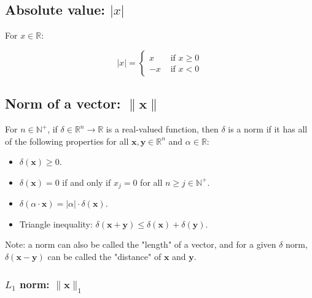 \documentclass[titlepage]{article}
\begin{document}
      \subsection{Absolute value: $|x|$}

        For $x \in \mathbb{R}$:

        \begin{equation*}
          | x | = \begin{cases}
              x & \text{ if } x \geq 0 \\
              -x & \text{ if } x < 0
          \end{cases}
        \end{equation*}

      \subsection{Norm of a vector: $\| \mathbf{x} \|$}

        For $n \in \mathbb{N}^+$, if
        $\delta \in \mathbb{R}^n \rightarrow \mathbb{R}$ is a
        real-valued function, then $\delta$ is a norm if it has all of the
        following properties for all $\mathbf{x}, \mathbf{y} \in \mathbb{R}^n$
        and $\alpha \in \mathbb{R}$:

        \begin{itemize}
          \item $\delta(\mathbf{x}) \geq 0$.

          \item $\delta(\mathbf{x}) = 0$ if and only if $x_j = 0$ for all
                $n \geq j \in \mathbb{N}^+$.

          \item $
                  \delta(\alpha \cdot \mathbf{x})
                    = |\alpha| \cdot \delta(\mathbf{x})
                $.

          \item Triangle inequality: $
                  \delta(\mathbf{x} + \mathbf{y}) \leq
                    \delta(\mathbf{x}) + \delta(\mathbf{y})
                $.
        \end{itemize}

        Note: a norm can also be called the "length" of a vector, and for a
        given $\delta$ norm, $\delta(\mathbf{x} - \mathbf{y})$ can be called
        the "distance" of $\mathbf{x}$ and $\mathbf{y}$.

        \subsubsection{$L_1$ norm: $\| \mathbf{x} \|_1$}
\end{document}

